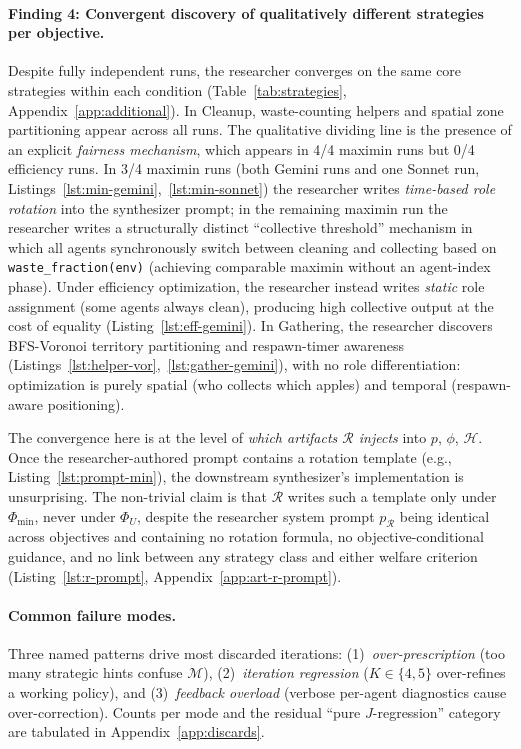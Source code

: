 \documentclass{article}
\newcommand{\cR}{\mathcal{R}}
\newcommand{\cM}{\mathcal{M}}
\begin{document}
\paragraph{Finding 4: Convergent discovery of qualitatively different strategies per objective.}
Despite fully independent runs, the researcher converges on the same core strategies within each condition (Table~\ref{tab:strategies}, Appendix~\ref{app:additional}). In Cleanup, waste-counting helpers and spatial zone partitioning appear across all runs. The qualitative dividing line is the presence of an explicit \emph{fairness mechanism}, which appears in 4/4 maximin runs but 0/4 efficiency runs. In 3/4 maximin runs (both Gemini runs and one Sonnet run, Listings~\ref{lst:min-gemini},~\ref{lst:min-sonnet}) the researcher writes \emph{time-based role rotation} into the synthesizer prompt; in the remaining maximin run the researcher writes a structurally distinct ``collective threshold'' mechanism in which all agents synchronously switch between cleaning and collecting based on \texttt{waste\_fraction(env)} (achieving comparable maximin without an agent-index phase). Under efficiency optimization, the researcher instead writes \emph{static} role assignment (some agents always clean), producing high collective output at the cost of equality (Listing~\ref{lst:eff-gemini}). In Gathering, the researcher discovers BFS-Voronoi territory partitioning and respawn-timer awareness (Listings~\ref{lst:helper-vor},~\ref{lst:gather-gemini}), with no role differentiation: optimization is purely spatial (who collects which apples) and temporal (respawn-aware positioning).

The convergence here is at the level of \emph{which artifacts $\cR$ injects} into $p$, $\phi$, $\mathcal{H}$. Once the researcher-authored prompt contains a rotation template (e.g., Listing~\ref{lst:prompt-min}), the downstream synthesizer's implementation is unsurprising. The non-trivial claim is that $\cR$ writes such a template only under $\Phi_{\min}$, never under $\Phi_U$, despite the researcher system prompt $p_\cR$ being identical across objectives and containing no rotation formula, no objective-conditional guidance, and no link between any strategy class and either welfare criterion (Listing~\ref{lst:r-prompt}, Appendix~\ref{app:art-r-prompt}).

\paragraph{Common failure modes.}
Three named patterns drive most discarded iterations: (1)~\emph{over-prescription} (too many strategic hints confuse $\cM$), (2)~\emph{iteration regression} ($K{\in}\{4,5\}$ over-refines a working policy), and (3)~\emph{feedback overload} (verbose per-agent diagnostics cause over-correction). Counts per mode and the residual ``pure $J$-regression'' category are tabulated in Appendix~\ref{app:discards}.
\end{document}
